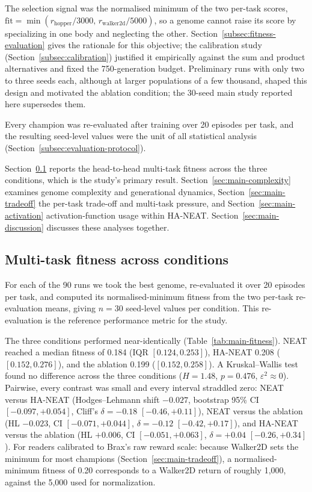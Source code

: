 \documentclass[12pt]{article}
\begin{document}
The selection signal was the normalised minimum of the two per-task scores, $\mathrm{fit} = \min(r_{\text{hopper}}/3000,\, r_{\text{walker2d}}/5000)$, so a genome cannot raise its score by specializing in one body and neglecting the other.
Section~\ref{subsec:fitness-evaluation} gives the rationale for this objective; the calibration study (Section~\ref{subsec:calibration}) justified it empirically against the sum and product alternatives and fixed the 750-generation budget.
Preliminary runs with only two to three seeds each, although at larger populations of a few thousand, shaped this design and motivated the ablation condition; the 30-seed main study reported here supersedes them.

Every champion was re-evaluated after training over 20 episodes per task, and the resulting seed-level values were the unit of all statistical analysis (Section~\ref{subsec:evaluation-protocol}).

Section~\ref{sec:main-study} reports the head-to-head multi-task fitness across the three conditions, which is the study's primary result.
Section~\ref{sec:main-complexity} examines genome complexity and generational dynamics, Section~\ref{sec:main-tradeoff} the per-task trade-off and multi-task pressure, and Section~\ref{sec:main-activation} activation-function usage within HA-NEAT.
Section~\ref{sec:main-discussion} discusses these analyses together.

\subsection{Multi-task fitness across conditions}
\label{sec:main-study}
For each of the 90 runs we took the best genome, re-evaluated it over 20 episodes per task, and computed its normalised-minimum fitness from the two per-task re-evaluation means, giving $n = 30$ seed-level values per condition.
This re-evaluation is the reference performance metric for the study.

The three conditions performed near-identically (Table~\ref{tab:main-fitness}).
NEAT reached a median fitness of 0.184 (IQR $[0.124, 0.253]$), HA-NEAT 0.208 ($[0.152, 0.276]$), and the ablation 0.199 ($[0.152, 0.258]$).
A Kruskal--Wallis test found no difference across the three conditions ($H = 1.48$, $p = 0.476$, $\varepsilon^2 \approx 0$).
Pairwise, every contrast was small and every interval straddled zero: NEAT versus HA-NEAT (Hodges--Lehmann shift $-0.027$, bootstrap 95\% CI $[-0.097, +0.054]$, Cliff's $\delta = -0.18$ $[-0.46, +0.11]$), NEAT versus the ablation (HL $-0.023$, CI $[-0.071, +0.044]$, $\delta = -0.12$ $[-0.42, +0.17]$), and HA-NEAT versus the ablation (HL $+0.006$, CI $[-0.051, +0.063]$, $\delta = +0.04$ $[-0.26, +0.34]$).
For readers calibrated to Brax's raw reward scale: because Walker2D sets the minimum for most champions (Section~\ref{sec:main-tradeoff}), a normalised-minimum fitness of 0.20 corresponds to a Walker2D return of roughly 1{,}000, against the 5{,}000 used for normalization.
\end{document}
